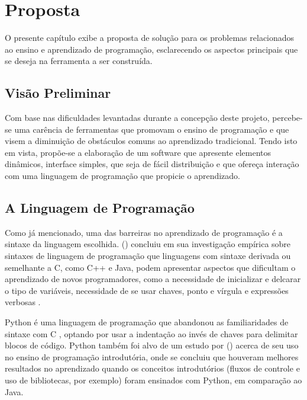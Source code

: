 \chapter*[Proposta]{Proposta}

O presente capítulo exibe a proposta de solução para os problemas relacionados ao ensino e aprendizado
de programação, esclarecendo os aspectos principais que se deseja na ferramenta a ser construída.

\section{Visão Preliminar}

Com base nas dificuldades levantadas durante a concepção deste projeto, percebe-se uma carência de ferramentas que promovam o ensino de programação e que visem a diminuição de obstáculos comuns ao aprendizado tradicional. Tendo isto em vista, propõe-se a elaboração de um software que apresente elementos dinâmicos, interface simples, que seja de fácil distribuição e que ofereça interação com uma linguagem de programação que propicie o aprendizado.

\section{A Linguagem de Programação}

Como já mencionado, uma das barreiras no aprendizado de programação é a sintaxe da linguagem escolhida. \citeauthor{stefik2013} (\citeyear{stefik2013}) concluiu em sua investigação empírica sobre sintaxes de linguagem de programação que linguagens com sintaxe derivada ou semelhante a C, como C++ e Java, podem apresentar aspectos que dificultam o aprendizado de novos programadores, como a necessidade de inicializar e delcarar o tipo de variáveis, necessidade de se usar chaves, ponto e vírgula e expressões verbosas \cite{mannila2006}.

Python é uma linguagem de programação que abandonou as familiaridades de sintaxe com C \cite{stefik2013}, optando por usar a indentação ao invés de chaves para delimitar blocos de código. Python também foi alvo de um estudo por \citeauthor{jayal2015} (\citeyear{jayal2015}) acerca de seu uso no ensino de programação introdutória, onde se concluiu que houveram melhores resultados no aprendizado quando os conceitos introdutórios (fluxos de controle e uso de bibliotecas, por exemplo) foram ensinados com Python, em comparação ao Java.

